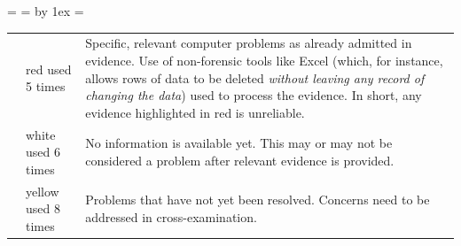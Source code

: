=\hbox{}%
 =  \advance {} by 1ex  = 
\begin{tabular}{@{}clp{3.75in}}
\vphantom{\copy0}{red}&red used 5 times&Specific, relevant computer problems as already admitted in evidence. Use of non-forensic tools like Excel (which, for instance, allows rows of data to be deleted \emph{without leaving any record of changing the data\/}) used to process the evidence. In short, any evidence highlighted in red is unreliable.\\ 
{white}&white used 6 times&No information is available yet. This may or may not be considered a problem after relevant evidence is provided.\\ 
{yellow}&yellow used 8 times&Problems that have not yet been resolved. Concerns need to be addressed in cross-examination.\\ 
 \end{tabular}

